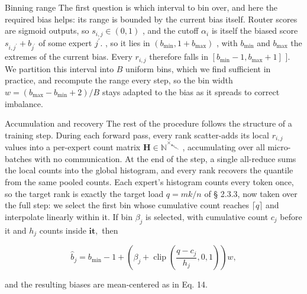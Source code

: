 \documentclass[
  10
]{article}
\begin{document}
Binning range The first question is which interval to bin over, and here
the required bias helps: its range is bounded by the current bias
itself. Router scores are sigmoid outputs, so
\(s _ { i , j } \in ( 0 , 1 )\) , and the cutoff \(\alpha _ { i }\) is
itself the biased score
\(s _ { i , j ^ { \prime } } + b _ { j ^ { \prime } }\) of some expert
\(j ^ { \prime } { } .\) , so it lies in
\(( b _ { \mathrm { m i n } } , 1 + b _ { \mathrm { m a x } } )\) , with
\(b _ { \mathrm { m i n } }\) and \(b _ { \mathrm { m a x } }\) the
extremes of the current bias. Every \(r _ { i , j }\) therefore falls in
\([ b _ { \operatorname* { m i n } } - 1 , b _ { \operatorname* { m a x } } + 1 ]\)
{]}. We partition this interval into \(B\) uniform bins, which we find
sufficient in practice, and recompute the range every step, so the bin
width
\(w = ( b _ { \operatorname* { m a x } } - b _ { \operatorname* { m i n } } + 2 ) / B\)
stays adapted to the bias as it spreads to correct imbalance.

Accumulation and recovery The rest of the procedure follows the
structure of a training step. During each forward pass, every rank
scatter-adds its local \(r _ { i , j }\) values into a per-expert count
matrix
\(\mathbf { H } \in \mathbb { N } ^ { \times _ { \boldsymbol { s } } _ { \boldsymbol { s } _ { \boldsymbol { s } } } _ { \boldsymbol { s } _ { \boldsymbol { s } } } _ { \boldsymbol { s } _ { \boldsymbol { s } } } }\)
, accumulating over all micro-batches with no communication. At the end
of the step, a single all-reduce sums the local counts into the global
histogram, and every rank recovers the quantile from the same pooled
counts. Each expert's histogram counts every token once, so the target
rank is exactly the target load \(q = m k / n\) of § 2.3.3, now taken
over the full step: we select the first bin whose cumulative count
reaches \(\lceil q \rceil\) and interpolate linearly within it. If bin
\(\beta _ { j }\) is selected, with cumulative count \(c _ { j }\)
before it and \(h _ { j }\) counts inside \(\mathbf { i t } ,\) then

\[
\widehat {b} _ {j} = b _ {\min} - 1 + \left(\beta_ {j} + \operatorname{clip} \left(\frac {q - c _ {j}}{h _ {j}}, 0, 1\right)\right) w,
\]

and the resulting biases are mean-centered as in Eq. 14.
\end{document}
